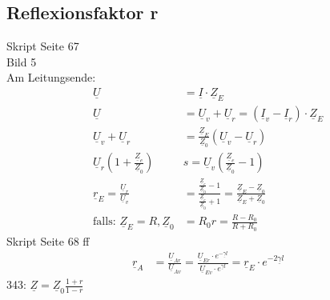 \subsection{Reflexionsfaktor r}
Skript Seite 67\\
Bild 5\\
Am Leitungsende:\\
\begin{align}
	\underline{U}&=\underline{I}\cdot\underline{Z}_E\nonumber\\
	\underline{U}&=\underline{U}_v+\underline{U}_r=\left(\underline{I}_v-\underline{I}_r\right)\cdot\underline{Z}_E\nonumber\\
	\underline{U}_v+\underline{U}_r&=\frac{\underline{Z}_E}{\underline{Z}_0}\left(\underline{U}_v-\underline{U}_r\right)\nonumber\\
	\underline{U}_r\left(1+\frac{\underline{Z}_e}{\underline{Z}_0}\right)&s=\underline{U}_v\left(\frac{\underline{Z}_e}{\underline{Z}_0}-1\right)\nonumber\\
	\underline{r}_E=\frac{\underline{U}_r}{\underline{U}_v}&=\frac{\frac{\underline{Z}_e}{\underline{Z}_0}-1}{\frac{\underline{Z}_e}{\underline{Z}_0}+1}=\frac{\underline{Z}_E-\underline{Z}_0}{\underline{Z}_E+\underline{Z}_0}\nonumber\\
	\text{falls: }\underline{Z}_E=R, \underline{Z}_0&=R_0
	\boxed{r=\frac{R-R_0}{R+R_0}}\nonumber
\end{align}
Skript Seite 68 ff\\
\begin{align}
	\underline{r}_A&=\frac{\underline{U}_{Ar}}{\underline{U}_{Av}}=\frac{\underline{U}_{Er}\cdot
	e^{-\underline{\gamma}  l}}{\underline{U}_{Ev}\cdot e^{\underline{\gamma}
	l}}=\boxed{\underline{r}_E\cdot e^{-2\underline{\gamma}l}}\nonumber
\end{align}
343: $\underline{Z}=\underline{Z}_0\frac{1+r}{1-r}$\\


